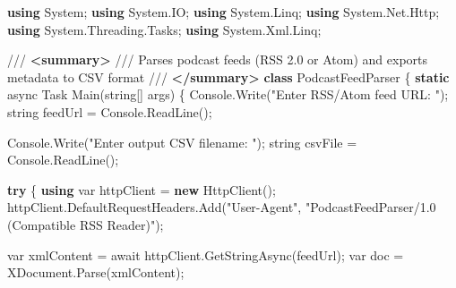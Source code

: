\documentclass[
  letterpaper,
  DIV=11,
  numbers=noendperiod]{scrartcl}
\newenvironment{Shaded}{\begin{snugshade}}{\end{snugshade}}
\newcommand{\CommentTok}[1]{\textcolor[rgb]{0.37,0.37,0.37}{#1}}
\newcommand{\DataTypeTok}[1]{\textcolor[rgb]{0.68,0.00,0.00}{#1}}
\newcommand{\FunctionTok}[1]{\textcolor[rgb]{0.28,0.35,0.67}{#1}}
\newcommand{\KeywordTok}[1]{\textcolor[rgb]{0.00,0.23,0.31}{\textbf{#1}}}
\newcommand{\NormalTok}[1]{\textcolor[rgb]{0.00,0.23,0.31}{#1}}
\newcommand{\OperatorTok}[1]{\textcolor[rgb]{0.37,0.37,0.37}{#1}}
\newcommand{\StringTok}[1]{\textcolor[rgb]{0.13,0.47,0.30}{#1}}
\begin{document}
\begin{Shaded}
\begin{Highlighting}[]
\KeywordTok{using}\NormalTok{ System}\OperatorTok{;}
\KeywordTok{using}\NormalTok{ System}\OperatorTok{.}\FunctionTok{IO}\OperatorTok{;}
\KeywordTok{using}\NormalTok{ System}\OperatorTok{.}\FunctionTok{Linq}\OperatorTok{;}
\KeywordTok{using}\NormalTok{ System}\OperatorTok{.}\FunctionTok{Net}\OperatorTok{.}\FunctionTok{Http}\OperatorTok{;}
\KeywordTok{using}\NormalTok{ System}\OperatorTok{.}\FunctionTok{Threading}\OperatorTok{.}\FunctionTok{Tasks}\OperatorTok{;}
\KeywordTok{using}\NormalTok{ System}\OperatorTok{.}\FunctionTok{Xml}\OperatorTok{.}\FunctionTok{Linq}\OperatorTok{;}

\CommentTok{/// }\KeywordTok{\textless{}summary\textgreater{}}
\CommentTok{/// Parses podcast feeds (RSS 2.0 or Atom) and exports metadata to CSV format}
\CommentTok{/// }\KeywordTok{\textless{}/summary\textgreater{}}
\KeywordTok{class}\NormalTok{ PodcastFeedParser}
\OperatorTok{\{}
    \KeywordTok{static}\NormalTok{ async Task }\FunctionTok{Main}\OperatorTok{(}\DataTypeTok{string}\OperatorTok{[]}\NormalTok{ args}\OperatorTok{)}
    \OperatorTok{\{}
\NormalTok{        Console}\OperatorTok{.}\FunctionTok{Write}\OperatorTok{(}\StringTok{"Enter RSS/Atom feed URL: "}\OperatorTok{);}
        \DataTypeTok{string}\NormalTok{ feedUrl }\OperatorTok{=}\NormalTok{ Console}\OperatorTok{.}\FunctionTok{ReadLine}\OperatorTok{();}

\NormalTok{        Console}\OperatorTok{.}\FunctionTok{Write}\OperatorTok{(}\StringTok{"Enter output CSV filename: "}\OperatorTok{);}
        \DataTypeTok{string}\NormalTok{ csvFile }\OperatorTok{=}\NormalTok{ Console}\OperatorTok{.}\FunctionTok{ReadLine}\OperatorTok{();}

        \KeywordTok{try}
        \OperatorTok{\{}
            \KeywordTok{using} \DataTypeTok{var}\NormalTok{ httpClient }\OperatorTok{=} \KeywordTok{new} \FunctionTok{HttpClient}\OperatorTok{();}
\NormalTok{            httpClient}\OperatorTok{.}\FunctionTok{DefaultRequestHeaders}\OperatorTok{.}\FunctionTok{Add}\OperatorTok{(}\StringTok{"User{-}Agent"}\OperatorTok{,} 
                \StringTok{"PodcastFeedParser/1.0 (Compatible RSS Reader)"}\OperatorTok{);}
            
            \DataTypeTok{var}\NormalTok{ xmlContent }\OperatorTok{=}\NormalTok{ await httpClient}\OperatorTok{.}\FunctionTok{GetStringAsync}\OperatorTok{(}\NormalTok{feedUrl}\OperatorTok{);}
            \DataTypeTok{var}\NormalTok{ doc }\OperatorTok{=}\NormalTok{ XDocument}\OperatorTok{.}\FunctionTok{Parse}\OperatorTok{(}\NormalTok{xmlContent}\OperatorTok{);}


\end{Highlighting}
\end{Shaded}
\end{document}
